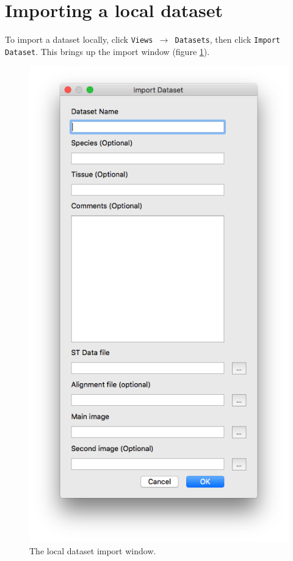 \documentclass[10pt,a4paper,titlepage]{book}
\begin{document}
\clearpage

\section{Importing a local dataset}
\label{sec:local_data}
To import a dataset locally, click \texttt{Views $\rightarrow$ Datasets}, then click \texttt{Import Dataset}. This brings up the import window (figure \ref{fig:import_local_dataset}).

\begin{figure}[h]
	\centering
	\includegraphics[scale=0.5]{./Pictures/import_dataset}
	\caption{The local dataset import window.}
	\label{fig:import_local_dataset}
\end{figure}
\end{document}
